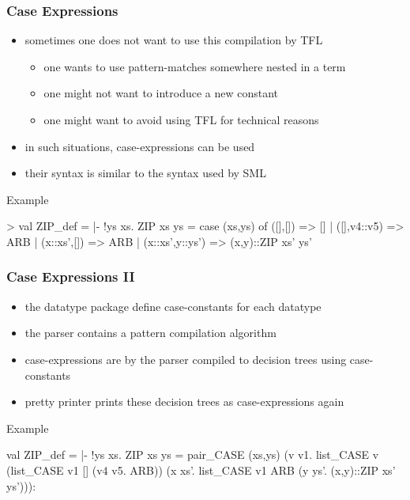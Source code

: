 \begin{frame}[fragile]
\frametitle{Case Expressions}

\begin{itemize}
\item sometimes one does not want to use this compilation by TFL
\begin{itemize}
\item one wants to use pattern-matches somewhere nested in a term
\item one might not want to introduce a new constant
\item one might want to avoid using TFL for technical reasons
\end{itemize}
\item in such situations, case-expressions can be used
\item their syntax is similar to the syntax used by SML
\end{itemize}

\begin{exampleblock}{Example}
\begin{semiverbatim}\scriptsize
> 
val ZIP_def = |- !ys xs. ZIP xs ys =
     case (xs,ys) of
       ([],[]) => []
     | ([],v4::v5) => ARB
     | (x::xs',[]) => ARB
     | (x::xs',y::ys') => (x,y)::ZIP xs' ys'
\end{semiverbatim}
\end{exampleblock}

\end{frame}



\begin{frame}[fragile]
\frametitle{Case Expressions II}

\begin{itemize}
\item the datatype package define case-constants for each datatype
\item the parser contains a pattern compilation algorithm
\item case-expressions are by the parser compiled to decision trees using case-constants
\item pretty printer prints these decision trees as case-expressions again 
\end{itemize}

\begin{exampleblock}{Example}
\begin{semiverbatim}\scriptsize
val ZIP_def = |- !ys xs. ZIP xs ys =
     pair_CASE (xs,ys)
       (\textbsl{}v v1.
          list_CASE v (list_CASE v1 [] (\textbsl{}v4 v5. ARB))
            (\textbsl{}x xs'. list_CASE v1 ARB (\textbsl{}y ys'. (x,y)::ZIP xs' ys'))):
\end{semiverbatim}
\end{exampleblock}

\end{frame}

